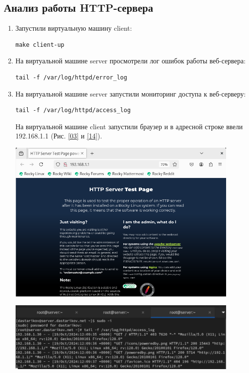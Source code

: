 \subsection{Анализ работы HTTP-сервера}
\begin{enumerate}

\item Запустили виртуальную машину client:
\begin{verbatim}
make client-up
\end{verbatim}

\item На виртуальной машине server просмотрели лог ошибок работы веб-сервера:
\begin{verbatim}
tail -f /var/log/httpd/error_log
\end{verbatim}
\item На виртуальной машине server запустили мониторинг доступа к веб-серверу:
\begin{verbatim}
tail -f /var/log/httpd/access_log
\end{verbatim}
На виртуальной машине client запустили браузер и в адресной строке ввели 192.168.1.1 (Рис. \ref{03} и  \ref{14}).


\begin{center}
    \centering
    \includegraphics[width=0.9\textwidth]{../images/image03.png}
    \label{03}
\end{center}

\begin{center}
    \centering
    \includegraphics[width=0.9\textwidth]{../images/image14.png}
    \label{14}
\end{center}

\end{enumerate}

